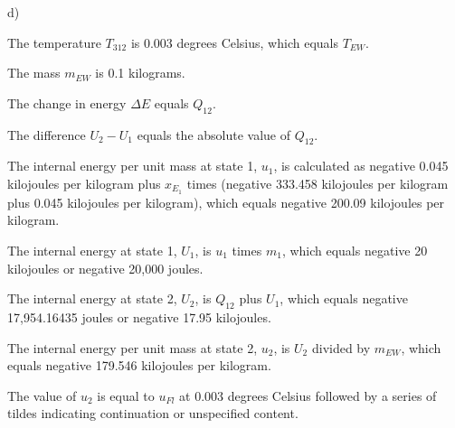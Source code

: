 d)

The temperature \( T_{312} \) is 0.003 degrees Celsius, which equals \( T_{EW} \).

The mass \( m_{EW} \) is 0.1 kilograms.

The change in energy \( \Delta E \) equals \( Q_{12} \).

The difference \( U_2 - U_1 \) equals the absolute value of \( Q_{12} \).

The internal energy per unit mass at state 1, \( u_1 \), is calculated as negative 0.045 kilojoules per kilogram plus \( x_{E_{1}} \) times (negative 333.458 kilojoules per kilogram plus 0.045 kilojoules per kilogram), which equals negative 200.09 kilojoules per kilogram.

The internal energy at state 1, \( U_1 \), is \( u_1 \) times \( m_1 \), which equals negative 20 kilojoules or negative 20,000 joules.

The internal energy at state 2, \( U_2 \), is \( Q_{12} \) plus \( U_1 \), which equals negative 17,954.16435 joules or negative 17.95 kilojoules.

The internal energy per unit mass at state 2, \( u_2 \), is \( U_2 \) divided by \( m_{EW} \), which equals negative 179.546 kilojoules per kilogram.

The value of \( u_2 \) is equal to \( u_{Fl} \) at 0.003 degrees Celsius followed by a series of tildes indicating continuation or unspecified content.